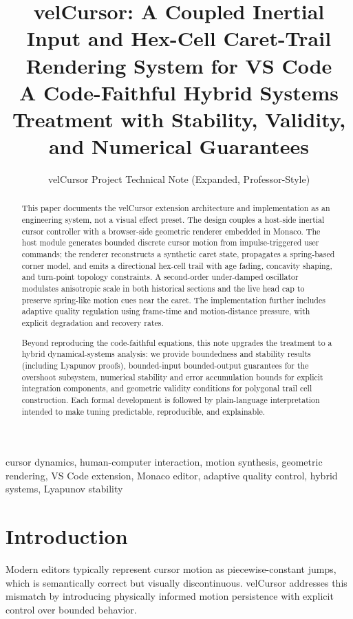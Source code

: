 \documentclass[journal]{IEEEtran}
\title{velCursor: A Coupled Inertial Input and Hex-Cell Caret-Trail Rendering System for VS Code\\
\large A Code-Faithful Hybrid Systems Treatment with Stability, Validity, and Numerical Guarantees}
\author{velCursor Project Technical Note (Expanded, Professor-Style)}
\begin{document}
\maketitle

\begin{abstract}
This paper documents the velCursor extension architecture and implementation as an engineering system, not a visual effect preset. The design couples a host-side inertial cursor controller with a browser-side geometric renderer embedded in Monaco. The host module generates bounded discrete cursor motion from impulse-triggered user commands; the renderer reconstructs a synthetic caret state, propagates a spring-based corner model, and emits a directional hex-cell trail with age fading, concavity shaping, and turn-point topology constraints. A second-order under-damped oscillator modulates anisotropic scale in both historical sections and the live head cap to preserve spring-like motion cues near the caret. The implementation further includes adaptive quality regulation using frame-time and motion-distance pressure, with explicit degradation and recovery rates.

Beyond reproducing the code-faithful equations, this note upgrades the treatment to a hybrid dynamical-systems analysis: we provide boundedness and stability results (including Lyapunov proofs), bounded-input bounded-output guarantees for the overshoot subsystem, numerical stability and error accumulation bounds for explicit integration components, and geometric validity conditions for polygonal trail cell construction. Each formal development is followed by plain-language interpretation intended to make tuning predictable, reproducible, and explainable.
\end{abstract}

\begin{IEEEkeywords}
cursor dynamics, human-computer interaction, motion synthesis, geometric rendering, VS Code extension, Monaco editor, adaptive quality control, hybrid systems, Lyapunov stability
\end{IEEEkeywords}

\section{Introduction}

Modern editors typically represent cursor motion as piecewise-constant jumps, which is semantically correct but visually discontinuous. velCursor addresses this mismatch by introducing physically informed motion persistence with explicit control over bounded behavior.
\end{document}
